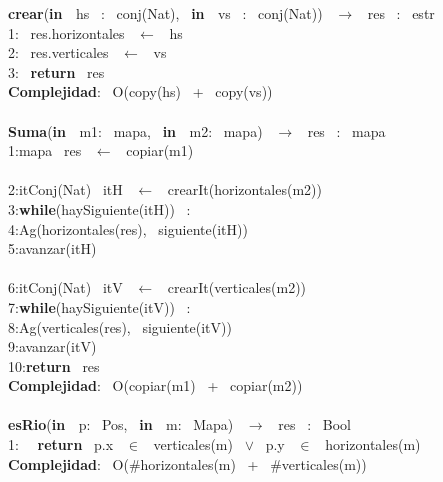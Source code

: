 \begin{Algoritmos}
    
\noindent \noindent\makebox[\linewidth]{\rule{\textwidth}{0.4pt}}
\textbf{crear}(\textbf{in \ }hs \ : \ conj(Nat), \ \textbf{in \ }vs \ : \ conj(Nat)) \ $\longrightarrow$ \ res \ : \ estr\\
1: \ res.horizontales \ $\leftarrow$ \ hs\\
2: \ res.verticales \ $\leftarrow$ \ vs \ \\
3: \ \textbf{return} \ res\\
\textbf{Complejidad}: \ O(copy(hs) \ + \ copy(vs))\\
\makebox[\linewidth]{\rule{\textwidth}{0.4pt}}
\\
\makebox[\linewidth]{\rule{\textwidth}{0.4pt}}
\textbf{Suma}(\textbf{in \ }m1: \ mapa, \ \textbf{in \ }m2: \ mapa) \ $\longrightarrow$ \ res \ : \ mapa\\
1:\indent mapa \ res \ $\leftarrow$ \ copiar(m1)\\
\\
2:\indent itConj(Nat) \ itH \ $\leftarrow$ \ crearIt(horizontales(m2))\\
3:\indent \textbf{while}(haySiguiente(itH)) \ :\\
4:\indent \indent Ag(horizontales(res), \ siguiente(itH))\\
5:\indent \indent avanzar(itH)\\
\\
6:\indent itConj(Nat) \ itV \ $\leftarrow$ \ crearIt(verticales(m2))\\
7:\indent \textbf{while}(haySiguiente(itV)) \ :\\
8:\indent \indent Ag(verticales(res), \ siguiente(itV))\\
9:\indent \indent avanzar(itV)\\
10:\indent \textbf{return} \ res\\
\textbf{Complejidad}: \ O(copiar(m1) \ + \ copiar(m2))\\
\makebox[\linewidth]{\rule{\textwidth}{0.4pt}}
\\
\makebox[\linewidth]{\rule{\textwidth}{0.4pt}}
\textbf{esRio}(\textbf{in \ }p: \ Pos, \ \textbf{in \ }m: \ Mapa) \ $\longrightarrow$ \ res \ : \ Bool\\
1: \  \ \textbf{return} \ p.x \ $\in$ \ verticales(m) \ $\vee$ \ p.y \ $\in$ \ horizontales(m)\\
\textbf{Complejidad}: \ O($ \# $horizontales(m) \ + \ $ \# $verticales(m))\\
\makebox[\linewidth]{\rule{\textwidth}{0.4pt}}

\end{Algoritmos}
